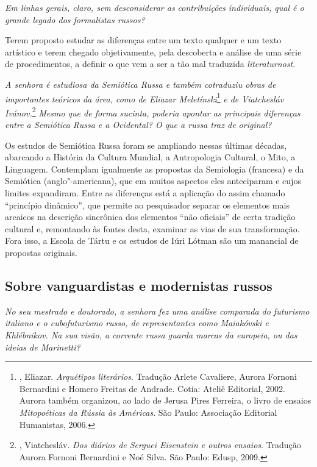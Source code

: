 \medskip

\emph{Em linhas gerais, claro, sem desconsiderar as contribuições
individuais, qual é o grande legado dos formalistas russos?}

Terem proposto estudar as diferenças entre um texto qualquer e um texto
artístico e terem chegado objetivamente, pela descoberta e análise de
uma série de procedimentos, a definir o que vem a ser a tão mal
traduzida \emph{literaturnost}.

\medskip

\emph{A senhora é estudiosa da Semiótica Russa e também cotraduziu obras
de importantes teóricos da área, como de Eliazar Meletínski}\footnote{, Eliazar. \emph{Arquétipos literários}. Tradução Arlete Cavaliere,
  Aurora Fornoni Bernardini e Homero Freitas de Andrade. Cotia:
  Ateliê Editorial, 2002. Aurora também organizou, ao lado de Jerusa
  Pires Ferreira, o livro de ensaios \emph{Mitopoéticas da Rússia às
  Américas}. São Paulo: Associação Editorial Humanistas, 2006.} \emph{e
de Viatchesláv Ivánov.}\footnote{, Viatchesláv. \emph{Dos diários
  de Serguei Eisenstein e outros ensaios}. Tradução Aurora Fornoni
  Bernardini e Noé Silva. São Paulo: Edusp, 2009.} \emph{Mesmo que de
forma sucinta, poderia apontar as principais diferenças entre a
Semiótica Russa e a Ocidental? O que a russa traz de original?}

Os estudos de Semiótica Russa foram se ampliando nessas últimas décadas,
abarcando a História da Cultura Mundial, a Antropologia Cultural, o
Mito, a Linguagem. Contemplam igualmente as propostas da Semiologia
(francesa) e da Semiótica (anglo"-americana), que em muitos aspectos eles
anteciparam e cujos limites expandiram. Entre as diferenças está a
aplicação do assim chamado ``princípio dinâmico'', que permite ao
pesquisador separar os elementos mais arcaicos na descrição sincrônica
dos elementos ``não oficiais'' de certa tradição cultural e, remontando
às fontes desta, examinar as vias de sua transformação. Fora isso, a
Escola de Tártu e os estudos de Iúri Lótman são um manancial de
propostas originais.

\subsection{\uppercase{S}obre vanguardistas e modernistas russos}

\emph{No seu mestrado e doutorado, a senhora fez uma análise comparada
do futurismo italiano e o cubofuturismo russo, de representantes como
Maiakóvski e Khlébnikov. Na sua visão, a corrente russa guarda marcas da europeia, ou das ideias de Marinetti?}

